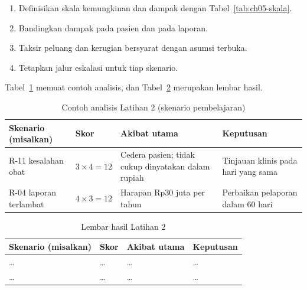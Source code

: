 \begin{enumerate}
  \item Definisikan skala kemungkinan dan dampak dengan Tabel~\ref{tab:ch05-skala}.
  \item Bandingkan dampak pada pasien dan pada laporan.
  \item Taksir peluang dan kerugian bersyarat dengan asumsi terbuka.
  \item Tetapkan jalur eskalasi untuk tiap skenario.
\end{enumerate}

Tabel~\ref{tab:ch05-lat2-contoh} memuat contoh analisis, dan Tabel~\ref{tab:ch05-lat2-hasil} merupakan
lembar hasil.

\begin{table}[!htb]
  \centering\small
  \caption{Contoh analisis Latihan 2 (skenario pembelajaran)}\label{tab:ch05-lat2-contoh}
  \begin{tabularx}{\textwidth}{|>{\raggedright\arraybackslash}X|>{\raggedright\arraybackslash}p{}|>{\raggedright\arraybackslash}X|>{\raggedright\arraybackslash}X|}
    \hline
    \textbf{Skenario (misalkan)} & \textbf{Skor} & \textbf{Akibat utama} & \textbf{Keputusan} \\ \hline
    R-11 kesalahan obat & $3 \times 4 = 12$ & Cedera pasien; tidak cukup dinyatakan dalam rupiah &
    Tinjauan klinis pada hari yang sama \\ \hline
    R-04 laporan terlambat & $4 \times 3 = 12$ & Harapan Rp30 juta per tahun & Perbaikan pelaporan
    dalam 60 hari \\ \hline
  \end{tabularx}
\end{table}

\begin{table}[!htb]
  \centering\small
  \caption{Lembar hasil Latihan 2}\label{tab:ch05-lat2-hasil}
  \begin{tabularx}{\textwidth}{|>{\raggedright\arraybackslash}X|>{\raggedright\arraybackslash}p{}|>{\raggedright\arraybackslash}X|>{\raggedright\arraybackslash}X|}
    \hline
    \textbf{Skenario (misalkan)} & \textbf{Skor} & \textbf{Akibat utama} & \textbf{Keputusan} \\ \hline
    \dots & \dots & \dots & \dots \\ \hline
    \dots & \dots & \dots & \dots \\ \hline
  \end{tabularx}
\end{table}


